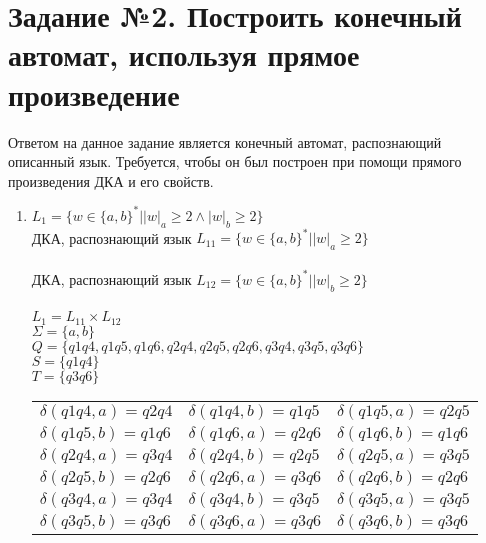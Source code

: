 \documentclass[a4paper, 12pt]{article}
\begin{document}
\section {Задание №2. Построить конечный автомат, используя прямое произведение}
Ответом на данное задание является конечный автомат, распознающий описанный язык. Требуется, чтобы он был построен при помощи прямого произведения ДКА и его свойств.

\begin{enumerate}
  \item $L_1 = \{w \in \{a, b\}^*| \left| w \right|_a \geq 2 \land     \left| w \right|_b \geq 2\}$ \\
    ДКА, распознающий язык $L_{11} = \{w \in \{a, b\}^*| \left| w \right|_a \geq 2 \}$ \\
  
     \\
  
    ДКА, распознающий язык $L_{12} = \{w \in \{a, b\}^*| \left| w \right|_b \geq 2\}$ \\
  
     \\
  
    $L_1 = L_{11} \times L_{12}$ \\
    $\Sigma=\{a,b\}$ \\
    $Q = \{q1q4, q1q5, q1q6, q2q4, q2q5, q2q6, q3q4, q3q5, q3q6\}$ \\
    $S = \{q1q4\}$ \\
    $T = \{q3q6\}$ \\
    \begin{tabular} {l l l}
        $\delta (q1q4, a) = q2q4 $ & $\delta (q1q4, b) = q1q5$ & $\delta (q1q5, a) = q2q5$ \\ 
        $\delta (q1q5, b) = q1q6$ & $\delta (q1q6, a) = q2q6$ & $\delta (q1q6, b) = q1q6 $ \\ $\delta (q2q4, a) = q3q4$ & $\delta (q2q4, b) = q2q5$ & $\delta (q2q5, a) = q3q5$ \\ 
        $\delta (q2q5, b) = q2q6$ & $\delta (q2q6, a) = q3q6$ & $\delta (q2q6, b) = q2q6$ \\ $\delta (q3q4, a) = q3q4$ & $\delta (q3q4, b)= q3q5$ & $\delta (q3q5, a) = q3q5 $\\ 
        $\delta (q3q5, b) = q3q6$  & $\delta (q3q6, a) = q3q6$ & $\delta (q3q6, b) = q3q6 $
    \end{tabular}\\
  

\end{enumerate}
\end{document}
